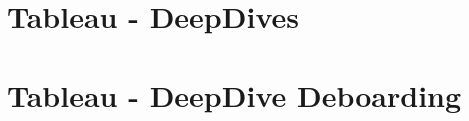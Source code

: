 \begin{appendices}
\section{Tableau - DeepDives}
\label{appendix:tableau_deepdives}

\begin{figure}[h]
\end{figure}
\newpage




\section{Tableau - DeepDive Deboarding}
\label{appendix:tableau_deepdive_deboarding}

\begin{figure}[h]
\end{figure}
\newpage


\end{appendices}